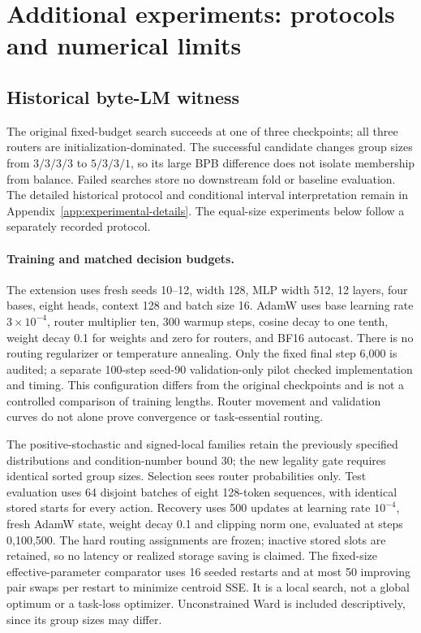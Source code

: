 \section{Additional experiments: protocols and numerical limits}
\label{app:enhancement-experiments}

\subsection{Historical byte-LM witness}
\label{app:historical-fold-witness}



The original fixed-budget search succeeds at one of three checkpoints;
all three routers are initialization-dominated. The successful candidate
changes group sizes from $3/3/3/3$ to $5/3/3/1$, so its large BPB difference
does not isolate membership from balance. Failed searches store no downstream
fold or baseline evaluation. The detailed historical protocol and conditional
interval interpretation remain in Appendix~\ref{app:experimental-details}.
The equal-size experiments below follow a separately recorded protocol.

\paragraph{Training and matched decision budgets.}
The extension uses fresh seeds 10--12, width 128, MLP width 512, 12 layers,
four bases, eight heads, context 128 and batch size 16. AdamW uses base
learning rate $3\times10^{-4}$, router multiplier ten, 300 warmup steps,
cosine decay to one tenth, weight decay 0.1 for weights and zero for routers,
and BF16 autocast. There is no routing regularizer or temperature annealing.
Only the fixed final step 6,000 is audited; a separate 100-step seed-90
validation-only pilot checked implementation and timing. This configuration
differs from the original checkpoints and is not a controlled comparison of
training lengths. Router movement and validation curves do not alone prove
convergence or task-essential routing.

The positive-stochastic and signed-local families retain the previously
specified distributions and condition-number bound 30; the new legality gate
requires identical sorted group sizes. Selection sees router probabilities
only. Test evaluation uses 64 disjoint batches of eight 128-token sequences,
with identical stored starts for every action. Recovery uses 500 updates at
learning rate $10^{-4}$, fresh AdamW state, weight decay 0.1 and clipping norm
one, evaluated at steps 0,100,500. The hard routing assignments are frozen;
inactive stored slots are retained, so no latency or realized storage saving
is claimed. The fixed-size effective-parameter comparator uses 16 seeded
restarts and at most 50 improving pair swaps per restart to minimize centroid
SSE. It is a local search, not a global optimum or a task-loss optimizer.
Unconstrained Ward is included descriptively, since its group sizes may differ.

